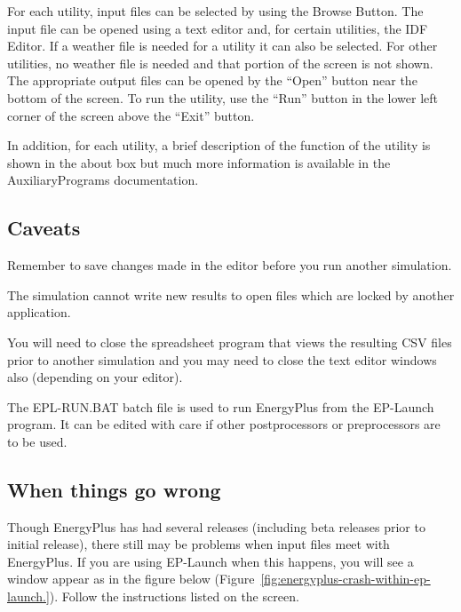 For each utility, input files can be selected by using the Browse Button. The input file can be opened using a text editor and, for certain utilities, the IDF Editor. If a weather file is needed for a utility it can also be selected. For other utilities, no weather file is needed and that portion of the screen is not shown. The appropriate output files can be opened by the ``Open'' button near the bottom of the screen. To run the utility, use the ``Run'' button in the lower left corner of the screen above the ``Exit'' button.

In addition, for each utility, a brief description of the function of the utility is shown in the about box but much more information is available in the AuxiliaryPrograms documentation.

\subsection{Caveats}\label{caveats}

Remember to save changes made in the editor before you run another simulation.

The simulation cannot write new results to open files which are locked by another application.

You will need to close the spreadsheet program that views the resulting CSV files prior to another simulation and you may need to close the text editor windows also (depending on your editor).

The EPL-RUN.BAT batch file is used to run EnergyPlus from the EP-Launch program. It can be edited with care if other postprocessors or preprocessors are to be used.

\subsection{When things go wrong}\label{when-things-go-wrong}

Though EnergyPlus has had several releases (including beta releases prior to initial release), there still may be problems when input files meet with EnergyPlus. If you are using EP-Launch when this happens, you will see a window appear as in the figure below (Figure~\ref{fig:energyplus-crash-within-ep-launch.}). Follow the instructions listed on the screen.

